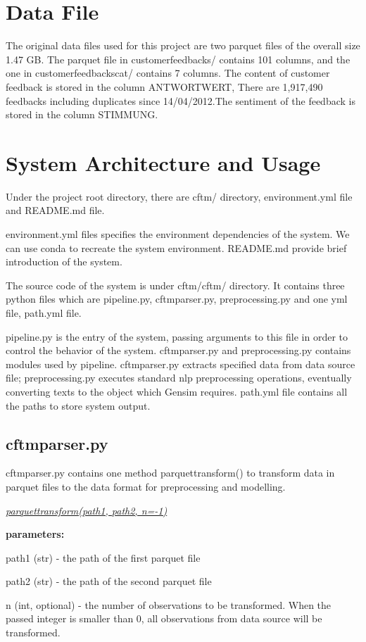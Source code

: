\documentclass{article} %
\begin{document}
\section{Data File}
The original data files used for this project are two parquet files of the overall size 1.47 GB.  The parquet file in customer\textunderscore{}feedbacks/ contains 101 columns, and the one in customer\textunderscore{}feedbacks\textunderscore{}cat/ contains 7 columns. The content of customer feedback is stored in the column ANTWORT\textunderscore{}WERT, There are 1,917,490 feedbacks including duplicates since 14/04/2012.The sentiment of the feedback is stored in the column STIMMUNG.

\section{System Architecture and Usage}
Under the project root directory, there are cftm/ directory, environment.yml file and README.md file.

environment.yml files specifies the environment dependencies of the system. We can use conda to recreate the system environment. README.md provide brief introduction of the system.

The source code of the system is under cftm/cftm/ directory. It contains three python files which are pipeline.py, cftm\textunderscore{}parser.py, preprocessing.py and one yml file, path.yml file. 

pipeline.py is the entry of the system, passing arguments to this file in order to control the behavior of the system. cftm\textunderscore{}parser.py and preprocessing.py contains modules used by pipeline. cftm\textunderscore{}parser.py extracts specified data from data source file; preprocessing.py executes standard nlp preprocessing operations, eventually converting texts to the object which Gensim requires. path.yml file contains all the paths to store system output.

\subsection{cftm\textunderscore{}parser.py}
cftm\textunderscore{}parser.py contains one method parquet\textunderscore{}transform() to transform data in parquet files to the data format for preprocessing and modelling.

\underline{\textit{parquet\textunderscore{}transform(path1, path2, n=-1)}}

\textbf{parameters: }
\begin{compactitem}
      \item path1 (str) - the path of the first parquet file
      \item path2 (str) - the path of the second parquet file
      \item n (int, optional) - the number of observations to be transformed. When the passed integer is smaller than 0, all observations from data source will be transformed.
\end{compactitem}
\end{document}
